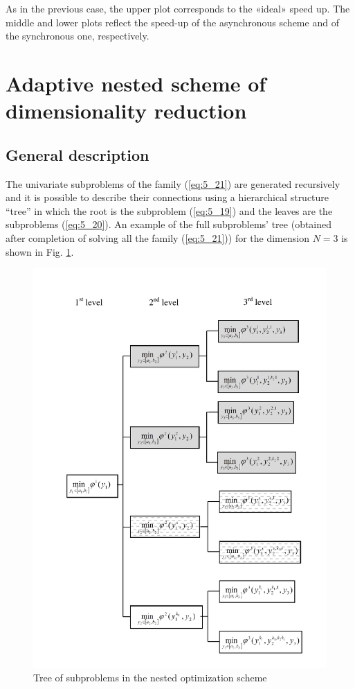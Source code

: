 As in the previous case, the upper plot corresponds to the «ideal» speed up. The middle and lower plots reflect the speed-up of the asynchronous scheme and of the synchronous one, respectively. 
\section{Adaptive nested scheme of dimensionality reduction}
\label{sec:5_4}
\subsection {General description}
\label{subsec:5_4_1}
The univariate subproblems of the family (\ref{eq:5_21}) are generated recursively and it is possible to describe their connections using a hierarchical structure “tree” in which  the root is the subproblem (\ref{eq:5_19}) and the leaves are the subproblems (\ref{eq:5_20}). An example of the full subproblems’  tree (obtained after completion of solving all the family (\ref{eq:5_21})) for the dimension $N=3$  is shown in Fig. \ref{fig:5_9}.
\begin{figure}[ht]
\centering
\includegraphics[width=1.0\linewidth]{figures/figure_5_9.pdf}
\caption{Tree of subproblems in the nested optimization scheme}
\label{fig:5_9}    
\end{figure}

